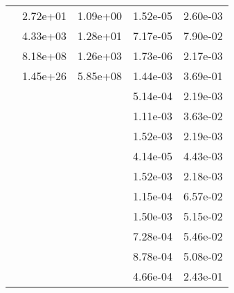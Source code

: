 \begin{table}
\begin{tabular}{c|cc|cc|}
\multicolumn{1}{|c|}{} & \multicolumn{1}{|c|}{  2.72e+01} & \multicolumn{1}{|c|}{  1.09e+00} & \multicolumn{1}{|c|}{  1.52e-05} & \multicolumn{1}{|c|}{  2.60e-03} \\ 
\multicolumn{1}{|c|}{} & \multicolumn{1}{|c|}{  4.33e+03} & \multicolumn{1}{|c|}{  1.28e+01} & \multicolumn{1}{|c|}{  7.17e-05} & \multicolumn{1}{|c|}{  7.90e-02} \\ 
\multicolumn{1}{|c|}{} & \multicolumn{1}{|c|}{  8.18e+08} & \multicolumn{1}{|c|}{  1.26e+03} & \multicolumn{1}{|c|}{  1.73e-06} & \multicolumn{1}{|c|}{  2.17e-03} \\ 
\multicolumn{1}{|c|}{} & \multicolumn{1}{|c|}{  1.45e+26} & \multicolumn{1}{|c|}{  5.85e+08} & \multicolumn{1}{|c|}{  1.44e-03} & \multicolumn{1}{|c|}{  3.69e-01} \\ 
\multicolumn{1}{|c|}{} & \multicolumn{1}{|c|}{} & \multicolumn{1}{|c|}{} & \multicolumn{1}{|c|}{  5.14e-04} & \multicolumn{1}{|c|}{  2.19e-03} \\ 
\multicolumn{1}{|c|}{} & \multicolumn{1}{|c|}{} & \multicolumn{1}{|c|}{} & \multicolumn{1}{|c|}{  1.11e-03} & \multicolumn{1}{|c|}{  3.63e-02} \\ 
\multicolumn{1}{|c|}{} & \multicolumn{1}{|c|}{} & \multicolumn{1}{|c|}{} & \multicolumn{1}{|c|}{  1.52e-03} & \multicolumn{1}{|c|}{  2.19e-03} \\ 
\multicolumn{1}{|c|}{} & \multicolumn{1}{|c|}{} & \multicolumn{1}{|c|}{} & \multicolumn{1}{|c|}{  4.14e-05} & \multicolumn{1}{|c|}{  4.43e-03} \\ 
\multicolumn{1}{|c|}{} & \multicolumn{1}{|c|}{} & \multicolumn{1}{|c|}{} & \multicolumn{1}{|c|}{  1.52e-03} & \multicolumn{1}{|c|}{  2.18e-03} \\ 
\multicolumn{1}{|c|}{} & \multicolumn{1}{|c|}{} & \multicolumn{1}{|c|}{} & \multicolumn{1}{|c|}{  1.15e-04} & \multicolumn{1}{|c|}{  6.57e-02} \\ 
\multicolumn{1}{|c|}{} & \multicolumn{1}{|c|}{} & \multicolumn{1}{|c|}{} & \multicolumn{1}{|c|}{  1.50e-03} & \multicolumn{1}{|c|}{  5.15e-02} \\ 
\multicolumn{1}{|c|}{} & \multicolumn{1}{|c|}{} & \multicolumn{1}{|c|}{} & \multicolumn{1}{|c|}{  7.28e-04} & \multicolumn{1}{|c|}{  5.46e-02} \\ 
\multicolumn{1}{|c|}{} & \multicolumn{1}{|c|}{} & \multicolumn{1}{|c|}{} & \multicolumn{1}{|c|}{  8.78e-04} & \multicolumn{1}{|c|}{  5.08e-02} \\ 
\multicolumn{1}{|c|}{} & \multicolumn{1}{|c|}{} & \multicolumn{1}{|c|}{} & \multicolumn{1}{|c|}{  4.66e-04} & \multicolumn{1}{|c|}{  2.43e-01} \\ 

\end{tabular}
\end{table}
